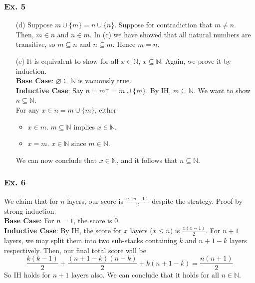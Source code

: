 \documentclass[aspectratio=169]{beamer}
\begin{document}
\begin{frame}
  \frametitle{Ex. 5}
  \begin{itemize}
    \item[(d)] Suppose $m\cup \{m\} = n\cup \{n\}$. Suppose for contradiction that $m\neq n$. Then, $m\in n$ and $n\in m$. In (c) we have 
    showed that all natural numbers are transitive, so $m\subseteq n$ and $n\subseteq m$. Hence $m = n$.
    \item[(e)] It is equivalent to show for all $x\in \mathbb{N}$, $x\subseteq \mathbb{N}$. Again, we prove it by induction. \\
    \textbf{Base Case}: $\varnothing \subseteq \mathbb{N}$ is vacuously true. \\
    \textbf{Inductive Case}: Say $n = m^+ = m\cup \{m\}$. By IH, $m\subseteq \mathbb{N}$. We want to show $n\subseteq \mathbb{N}$. \\
    For any $x\in n = m\cup \{m\}$, either
    \begin{itemize}
      \item $x\in m$. $m\subseteq \mathbb{N}$ implies $x\in \mathbb{N}$. 
      \item $x = m$. $x\in\mathbb{N}$ since $m\in \mathbb{N}$.
    \end{itemize}
    We can now conclude that $x\in \mathbb{N}$, and it follows that $n\subseteq \mathbb{N}$.
  \end{itemize}
\end{frame}
\begin{frame}
  \frametitle{Ex. 6}
  We claim that for $n$ layers, our score is $\frac{n\left(n-1\right)}{2}$ despite the strategy. Proof by strong induction. \\
  \textbf{Base Case}: For $n=1$, the score is 0. \\
  \textbf{Inductive Case}: By IH, the score for $x$ layers ($x\leq n$) is $\frac{x\left(x-1\right)}{2}$. 
  For $n + 1$ layers, we may split them into two sub-stacks containing $k$ and $n + 1 - k$ layers respectively. Then, 
  our final total score will be
  \begin{equation*}
    \frac{k\left(k-1\right)}{2} + \frac{\left(n+1-k\right)\left(n-k\right)}{2} + k\left(n+1-k\right) = \frac{n\left(n+1\right)}{2}
  \end{equation*}
  So IH holds for $n + 1$ layers also. We can conclude that it holds for all $n\in\mathbb{N}$. 
\end{frame}
\end{document}
